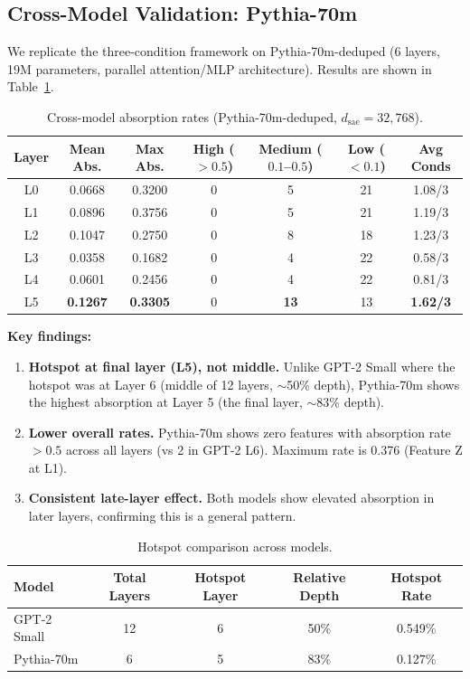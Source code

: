 \documentclass{article}
\begin{document}
\subsection{Cross-Model Validation: Pythia-70m}
\label{subsec:results-pythia}

We replicate the three-condition framework on Pythia-70m-deduped (6 layers, 19M parameters, parallel attention/MLP architecture). Results are shown in Table~\ref{tab:pythia}.

\begin{table}[htbp]
\centering
\caption{Cross-model absorption rates (Pythia-70m-deduped, $d_{\text{sae}}=32{,}768$).}
\label{tab:pythia}
\begin{tabular}{@{}ccccccc@{}}
\toprule
Layer & Mean Abs. & Max Abs. & High ($>0.5$) & Medium ($0.1$--$0.5$) & Low ($<0.1$) & Avg Conds \\
\midrule
L0 & 0.0668 & 0.3200 & 0 & 5 & 21 & 1.08/3 \\
L1 & 0.0896 & 0.3756 & 0 & 5 & 21 & 1.19/3 \\
L2 & 0.1047 & 0.2750 & 0 & 8 & 18 & 1.23/3 \\
L3 & 0.0358 & 0.1682 & 0 & 4 & 22 & 0.58/3 \\
L4 & 0.0601 & 0.2456 & 0 & 4 & 22 & 0.81/3 \\
L5 & \textbf{0.1267} & \textbf{0.3305} & 0 & \textbf{13} & 13 & \textbf{1.62/3} \\
\bottomrule
\end{tabular}
\end{table}

\textbf{Key findings:}

\begin{enumerate}
    \item \textbf{Hotspot at final layer (L5), not middle.} Unlike GPT-2 Small where the hotspot was at Layer 6 (middle of 12 layers, $\sim$50\% depth), Pythia-70m shows the highest absorption at Layer 5 (the final layer, $\sim$83\% depth).
    \item \textbf{Lower overall rates.} Pythia-70m shows zero features with absorption rate $>0.5$ across all layers (vs 2 in GPT-2 L6). Maximum rate is 0.376 (Feature Z at L1).
    \item \textbf{Consistent late-layer effect.} Both models show elevated absorption in later layers, confirming this is a general pattern.
\end{enumerate}

\begin{table}[htbp]
\centering
\caption{Hotspot comparison across models.}
\label{tab:hotspot-compare}
\begin{tabular}{@{}lcccc@{}}
\toprule
Model & Total Layers & Hotspot Layer & Relative Depth & Hotspot Rate \\
\midrule
GPT-2 Small & 12 & 6 & 50\% & 0.549\% \\
Pythia-70m & 6 & 5 & 83\% & 0.127\% \\
\bottomrule
\end{tabular}
\end{table}
\end{document}
